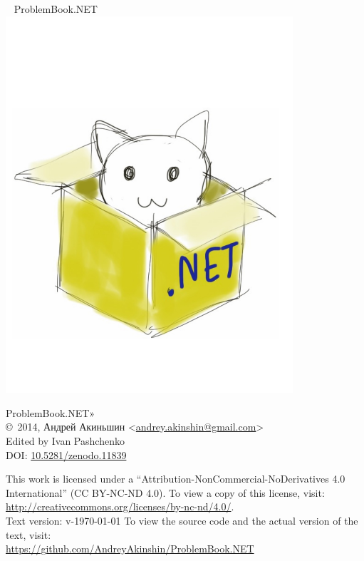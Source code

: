 \begin{center}
~\vspace{4cm}\newline
{\Huge{ProblemBook.NET}}
\includegraphics[width=0.8\textwidth]{cover}
\end{center}
\newpage

\hbox{}
\vfill
{
\noindent
ProblemBook.NET»\\
\copyright\ 2014, Андрей Акиньшин <\href{mailto:andrey.akinshin@gmail.com}{andrey.akinshin@gmail.com}>\\
Edited by Ivan Pashchenko\\
DOI: \href{http://dx.doi.org/10.5281/zenodo.11839}{10.5281/zenodo.11839}

\medskip
\noindent
This work is licensed under a ``Attribution-NonCommercial-NoDerivatives 4.0 International'' (CC BY-NC-ND 4.0). To view a copy of this license, visit:\\ \url{http://creativecommons.org/licenses/by-nc-nd/4.0/}.\\
Text version: v-\versiondate\today \newline
To view the source code and the actual version of the text, visit:\\ \url{https://github.com/AndreyAkinshin/ProblemBook.NET}
}
\newpage